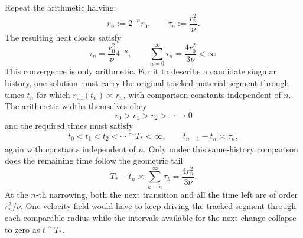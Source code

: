 
Repeat the arithmetic halving:
\[
  r_n:=2^{-n}r_0,
  \qquad
  \tau_n:=\frac{r_n^2}{\nu}.
\]
The resulting heat clocks satisfy
\[
  \tau_n
  =
  \frac{r_0^2}{\nu}4^{-n},
  \qquad
  \sum_{n=0}^{\infty}\tau_n
  =
  \frac{4r_0^2}{3\nu}
  <
  \infty.
\]
This convergence is only arithmetic. For it to describe a candidate singular history, one \NavierStokes{} solution must carry the original tracked material segment through times \(t_n\) for which \(r_{\mathrm{eff}}(t_n)\asymp r_n\), with comparison constants independent of \(n\). The arithmetic widths themselves obey
\[
  r_0>r_1>r_2>\cdots\longrightarrow0
\]
and the required times must satisfy
\[
  t_0<t_1<t_2<\cdots\uparrow T_*<\infty,
  \qquad
  t_{n+1}-t_n\asymp\tau_n,
\]
again with constants independent of \(n\). Only under this same-history comparison does the remaining time follow the geometric tail
\[
  T_*-t_n
  \asymp
  \sum_{k=n}^{\infty}\tau_k
  =
  \frac{4r_n^2}{3\nu}.
\]
At the \(n\)-th narrowing, both the next transition and all the time left are of order \(r_n^2/\nu\). One velocity field would have to keep driving the tracked segment through each comparable radius while the intervals available for the next change collapse to zero as \(t\uparrow T_*\).
